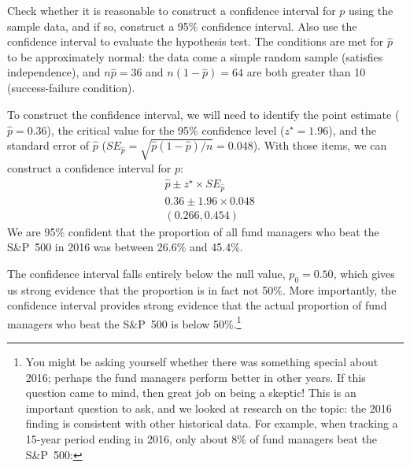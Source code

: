 \begin{example}{Check whether it is reasonable to construct
    a confidence interval for $p$ using the sample data, and
    if so, construct a 95\% confidence interval. Also use
    the confidence interval to evaluate the hypothesis test.}
  The conditions are met for $\hat{p}$ to be approximately
  normal: the data come a simple random sample (satisfies
  independence), and $n\hat{p} = 36$ and
  $n(1 - \hat{p}) = 64$ are both greater than 10 (success-failure
  condition).

  To construct the confidence interval, we will need to identify
  the point estimate ($\hat{p} = 0.36$), the critical value for
  the 95\% confidence level ($z^{\star} = 1.96$), and the standard
  error of $\hat{p}$
  ($SE_{\hat{p}} = \sqrt{\hat{p}(1 - \hat{p}) / n} = 0.048$).
  With those items, we can construct a confidence interval for $p$:
  \begin{align*}
    &\hat{p} \pm z^{\star} \times SE_{\hat{p}} \\
    &0.36 \pm 1.96 \times 0.048 \\
    &(0.266, 0.454)
  \end{align*}
  We are 95\% confident that the proportion of all fund
  managers who beat the S\&P~500 in 2016 was between 26.6\%
  and 45.4\%.

  The confidence interval falls entirely below the
  null value, $p_0 = 0.50$, which gives us strong evidence
  that the proportion is in fact not 50\%.
  More importantly,
  the confidence interval provides strong evidence that the
  actual proportion of fund managers who beat the S\&P~500
  is below 50\%.\footnote{You might be asking
  yourself whether there was something special about 2016;
  perhaps the fund managers perform better in other years.
  If this question came to mind, then great job on being
  a skeptic! This is an important question to ask,
  and we looked at research on the topic:
  the 2016 finding is consistent with other historical data.
  For example, when tracking a 15-year period ending
  in 2016, only about 8\% of fund managers beat the S\&P~500:
  }
\end{example}

